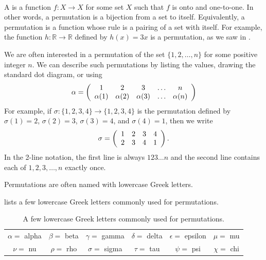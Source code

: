 \begin{defn}[Permutation]
\label{defn_permutation}
~    
    \begin{apart}
        \item A  is a function $f:X \to X$ for some set $X$ such that $f$ is onto and one-to-one. In other words, a permutation is a bijection from a set to itself. Equivalently, a permutation is a function whose rule is a pairing of a set with itself. For example, the function $h: \mathbb{R} \to \mathbb{R}$ defined by $h(x) = 3x$ is a permutation, as we saw in .
        \item We are often interested in a permutation of the set $\{1,2,\ldots,n\}$ for some positive integer $n$.  We can describe such permutations by listing the values, drawing the standard dot diagram, or using 
            $$\alpha = 
            \left(\begin{array} {ccc cc}
            1 & 2 & 3 & \ldots & n \\
            \alpha(1) & \alpha(2) & \alpha(3) & \ldots & \alpha(n) 
            \end{array} \right)$$
        For example, if $\sigma: \{1,2,3,4\} \to \{1,2,3,4\}$ is the permutation defined by $\sigma(1)=2$, $\sigma(2)=3$, $\sigma(3)=4$, and $\sigma(4)=1$, then we write 
            $$\sigma = 
            \left(\begin{array} {ccc c}
            1 & 2 & 3 & 4 \\
            2 & 3 & 4 & 1
            \end{array} \right).$$
        In the 2-line notation, the first line is always $1 2 3 \ldots n$ and the second line contains each of $1, 2, 3, \ldots, n$ exactly once.
    \end{apart}  
\end{defn}

Permutations are often named with lowercase Greek letters.

\begin{rem}
\label{rem_Greek_letters}
     lists a few lowercase Greek letters commonly used for permutations.
        \begin{table}[hbtp]
            \centering
            \begin{tabular}{cccccc}
                $\alpha=$ alpha & 
                $\beta=$ beta &
                $\gamma=$ gamma & 
                $\delta=$ delta & 
                $\epsilon=$ epsilon &
                $\mu=$ mu  \\
                $\nu=$ nu &
                $\rho=$ rho &
                $\sigma=$ sigma &
                $\tau=$ tau &
                $\psi=$ psi &
                $\chi=$ chi 
            \end{tabular}
            \caption{A few lowercase Greek letters commonly used for permutations.}
            \label{table_lowercase_greek}
        \end{table}
\end{rem}


